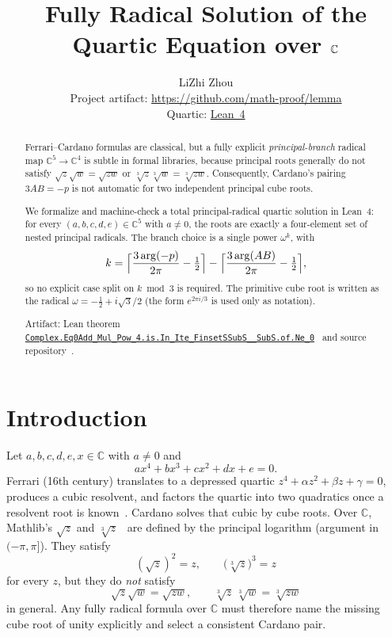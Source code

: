 \documentclass[11pt,a4paper]{article}
\title{Fully Radical Solution of the Quartic Equation over \(\C\)}
\author{LiZhi Zhou\\[0.3em]
\small Project artifact: \url{https://github.com/math-proof/lemma}\\[0.2em]
\small Quartic:
\href{http://www.lemma.cn/lean/?module=Complex.Eq0Add_Mul_Pow_4.is.In_Ite_FinsetSSubS__SubS.of.Ne_0}{Lean~4}}
\date{}
\newcommand{\C}{\mathbb{C}}
\newcommand{\Arg}{\operatorname{arg}}
\begin{document}
\maketitle

\begin{abstract}
Ferrari--Cardano formulas are classical, but a fully explicit \emph{principal-branch} radical map
\(\C^5\to\C^4\) is subtle in formal libraries, because principal roots generally do not satisfy
\(\sqrt{z}\sqrt{w}=\sqrt{zw}\) or \(\sqrt[3]{z}\sqrt[3]{w}=\sqrt[3]{zw}\).
Consequently, Cardano's pairing \(3AB=-p\) is not automatic for two independent principal cube roots.

We formalize and machine-check a total principal-radical quartic solution in Lean~4:
for every \((a,b,c,d,e)\in\C^5\) with \(a\neq 0\), the roots are exactly a four-element set of nested principal radicals.
The branch choice is a single power \(\omega^k\), with
\[
k=\Bigl\lceil\frac{3\Arg(-p)}{2\pi}-\tfrac12\Bigr\rceil
-\Bigl\lceil\frac{3\Arg(AB)}{2\pi}-\tfrac12\Bigr\rceil,
\]
so no explicit case split on \(k\bmod 3\) is required.
The primitive cube root is written as the radical
\(\omega=-\tfrac12+i\sqrt{3}/2\) (the form \(e^{2\pi i/3}\) is used only as notation).

Artifact: Lean theorem
\href{http://www.lemma.cn/lean/?module=Complex.Eq0Add_Mul_Pow_4.is.In_Ite_FinsetSSubS__SubS.of.Ne_0}{\nolinkurl{Complex.Eq0Add_Mul_Pow_4.is.In_Ite_FinsetSSubS__SubS.of.Ne_0}}~\cite{lemma_quartic_lean}
and source repository~\cite{lemma_repo}.
\end{abstract}

\section{Introduction}
\label{sec:intro}

Let \(a,b,c,d,e,x\in\C\) with \(a\neq 0\) and
\[
a x^4+b x^3+c x^2+d x+e=0.
\]
Ferrari (16th century) translates to a depressed quartic \(z^4+\alpha z^2+\beta z+\gamma=0\), produces a cubic resolvent, and factors the quartic into two quadratics once a resolvent root is known~\cite{cardano1545}.
Cardano solves that cubic by cube roots.
Over \(\C\), Mathlib's \(\sqrt{z}\) and \(\sqrt[3]{z}\)~\cite{mathlib2020,mathlib} are defined by the principal logarithm (argument in \((-\pi,\pi]\)).
They satisfy
\[
(\sqrt{z})^2=z,\qquad \bigl(\sqrt[3]{z}\bigr)^3=z
\]
for every \(z\), but they do \emph{not} satisfy
\[
\sqrt{z}\sqrt{w}=\sqrt{zw},\qquad \sqrt[3]{z}\,\sqrt[3]{w}=\sqrt[3]{zw}
\]
in general.
Any fully radical formula over \(\C\) must therefore name the missing cube root of unity explicitly and select a consistent Cardano pair.
\end{document}
